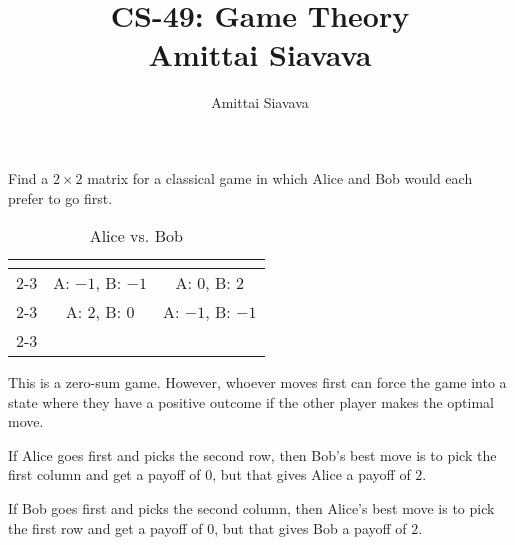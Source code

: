 \documentclass[11pt, reqno]{amsart}
\begin{document}

\title{CS-49: Game Theory\\ Amittai Siavava \\ }
\author{Amittai Siavava}


\setlength{\headheight}{13.0pt}
\setlength{\footskip}{15.0pt}

\maketitle

\begin{problem}
  Find a $2 \times 2$ matrix for a classical game in which Alice and Bob
  would each prefer to go first.

  \begin{table}[H]
    \centering
    \begin{tabular}{c|c|c|}
      \multicolumn{3}{c}{\raisebox{1ex}{Bob}} \\ \cline{2-3}
      \multirow[]{2}{1cm}{Alice} &
       A: $-1$,\; B: $-1$ & A: $0$,\; B: $2$ \\ \cline{2-3}
       & A: $2$,\; B: $0$ & A: $-1$,\; B: $-1$ \\ \cline{2-3}
    \end{tabular}
    \caption{Alice vs. Bob}
  \end{table}

  This is a zero-sum game.
  However, whoever moves first can force the game into a state where
  they have a positive outcome if the other player makes the optimal move.
  \begin{enumarabic}
    \item If Alice goes first and picks the second row, then Bob's best move
      is to pick the first column and get a payoff of $0$, but that gives Alice a payoff of $2$.

    \item If Bob goes first and picks the second column, then Alice's best move
      is to pick the first row and get a payoff of $0$, but that gives Bob a payoff of $2$.
  \end{enumarabic}

\end{problem}
\end{document}
